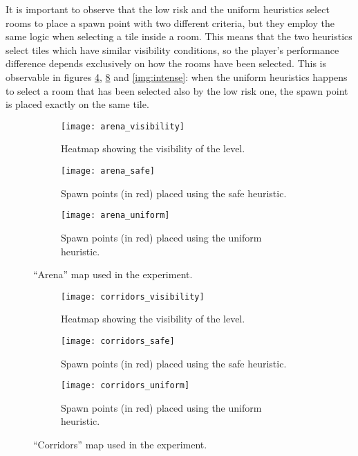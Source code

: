 It is important to observe that the low risk and the uniform heuristics select rooms to place a spawn point with two different criteria, but they employ the same logic when selecting a tile inside a room. This means that the two heuristics select tiles which have similar visibility conditions, so the player's performance difference depends exclusively on how the rooms have been selected. This is observable in figures \ref{img:arena}, \ref{img:corridors} and \ref{img:intense}: when the uniform heuristics happens to select a room that has been selected also by the low risk one, the spawn point is placed exactly on the same tile.

\begin{figure}[tp]
	\centering
	\begin{subfigure}[t]{0.3\linewidth}
    		\texttt{[image: arena\_visibility]}
     		\caption{Heatmap showing the visibility of the level.}
		\label{img:arena_visibility}
  	\end{subfigure}  	
  	\hfil
  	\begin{subfigure}[t]{0.3\linewidth}
    		\texttt{[image: arena\_safe]}
     		\caption{Spawn points (in red) placed using the safe heuristic.}
     		\label{img:arena_safe}
  	\end{subfigure}
  	\hfil
  	\begin{subfigure}[t]{0.3\linewidth}
    		\texttt{[image: arena\_uniform]}
     		\caption{Spawn points (in red) placed using the uniform heuristic.}
		\label{img:arena_uniform}
  	\end{subfigure}  
	\caption{``Arena'' map used in the experiment.}
	\label{img:arena}
\end{figure}

\begin{figure}[tp]
	\centering
  	\begin{subfigure}[t]{0.3\linewidth}
    		\texttt{[image: corridors\_visibility]}
     		\caption{Heatmap showing the visibility of the level.}
		\label{img:corridors_visibility}
  	\end{subfigure}  	  
  	\hfil
  	\begin{subfigure}[t]{0.3\linewidth}
    		\texttt{[image: corridors\_safe]}
     		\caption{Spawn points (in red) placed using the safe heuristic.}
     		\label{img:corridors_safe}
  	\end{subfigure}
  	\hfil
  	\begin{subfigure}[t]{0.3\linewidth}
    		\texttt{[image: corridors\_uniform]}
     		\caption{Spawn points (in red) placed using the uniform heuristic.}
		\label{img:corridors_uniform}
  	\end{subfigure}	
	\caption{``Corridors'' map used in the experiment.}
	\label{img:corridors}
\end{figure}

